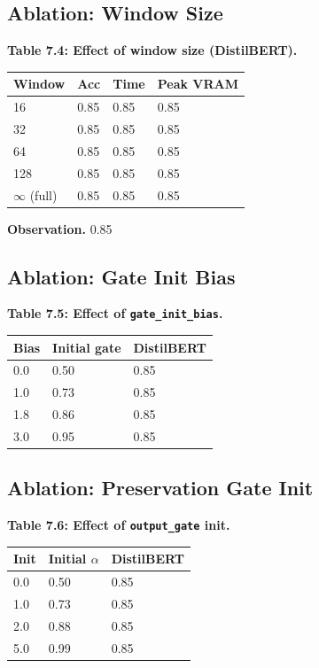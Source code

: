 \subsection{Ablation: Window Size}

\textbf{Table 7.4: Effect of window size (DistilBERT).}

\begin{table}[H]
\centering
\small
\begin{tabular}{llll}
\toprule
\textbf{Window} & \textbf{Acc} & \textbf{Time} & \textbf{Peak VRAM} \\
\midrule
16 & 0.85 & 0.85 & 0.85 \\
32 & 0.85 & 0.85 & 0.85 \\
64 & 0.85 & 0.85 & 0.85 \\
128 & 0.85 & 0.85 & 0.85 \\
$\infty$ (full) & 0.85 & 0.85 & 0.85 \\
\bottomrule
\end{tabular}
\end{table}

\textbf{Observation.} 0.85

\subsection{Ablation: Gate Init Bias}

\textbf{Table 7.5: Effect of \texttt{gate\_init\_bias}.}

\begin{table}[H]
\centering
\small
\begin{tabular}{lll}
\toprule
\textbf{Bias} & \textbf{Initial gate} & \textbf{DistilBERT} \\
\midrule
0.0 & 0.50 & 0.85 \\
1.0 & 0.73 & 0.85 \\
1.8 & 0.86 & 0.85 \\
3.0 & 0.95 & 0.85 \\
\bottomrule
\end{tabular}
\end{table}

\subsection{Ablation: Preservation Gate Init}

\textbf{Table 7.6: Effect of \texttt{output\_gate} init.}

\begin{table}[H]
\centering
\small
\begin{tabular}{lll}
\toprule
\textbf{Init} & \textbf{Initial $\alpha$} & \textbf{DistilBERT} \\
\midrule
0.0 & 0.50 & 0.85 \\
1.0 & 0.73 & 0.85 \\
2.0 & 0.88 & 0.85 \\
5.0 & 0.99 & 0.85 \\
\bottomrule
\end{tabular}
\end{table}

